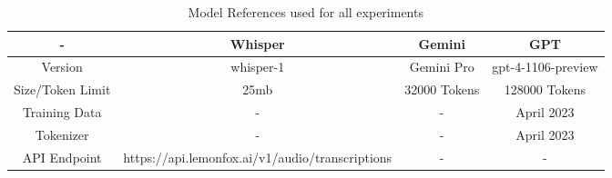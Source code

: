 

\begin{table}[ht]
    \centering
    \begin{tabular}{|c|c|c|c|}
        \hline - & \textbf{Whisper} & \textbf{Gemini}  & \textbf{GPT} \\
        \hline Version & whisper-1  &  Gemini Pro & gpt-4-1106-preview \\
        \hline Size/Token Limit & 25mb   & 32000 Tokens & 128000 Tokens \\    \hline Training Data & - & - & April 2023 \\   
        \hline Tokenizer & -  & - & April 2023\\ 
        \hline API Endpoint & https://api.lemonfox.ai/v1/audio/transcriptions & - & - \\    
  \hline

    \end{tabular}
    \caption{Model References used for all experiments}
    \label{tab:standard_params}
\end{table}